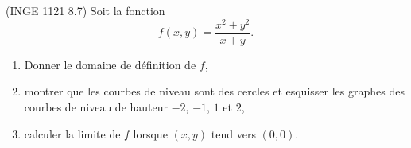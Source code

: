 

\begin{exercice}\label{exoFoncDeuxVar0016}

	(INGE 1121 8.7) Soit la fonction
	\begin{equation}
		f(x,y)=\frac{ x^2+y^2 }{ x+y }.
	\end{equation}
	\begin{enumerate}

		\item
			Donner le domaine de définition de $f$,
		\item
			montrer que les courbes de niveau sont des cercles et esquisser les graphes des courbes de niveau de hauteur $-2$, $-1$, $1$ et $2$,
		\item
			calculer la limite de $f$ lorsque $(x,y)$ tend vers $(0,0)$.

	\end{enumerate}

\end{exercice}
